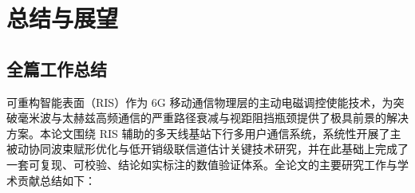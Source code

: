 \chapter{总结与展望}
\label{chap:conclusion}

\section{全篇工作总结}

可重构智能表面（RIS）作为 6G 移动通信物理层的主动电磁调控使能技术，为突破毫米波与太赫兹高频通信的严重路径衰减与视距阻挡瓶颈提供了极具前景的解决方案。本论文围绕 RIS 辅助的多天线基站下行多用户通信系统，系统性开展了主被动协同波束赋形优化与低开销级联信道估计关键技术研究，并在此基础上完成了一套可复现、可校验、结论如实标注的数值验证体系。全论文的主要研究工作与学术贡献总结如下：

